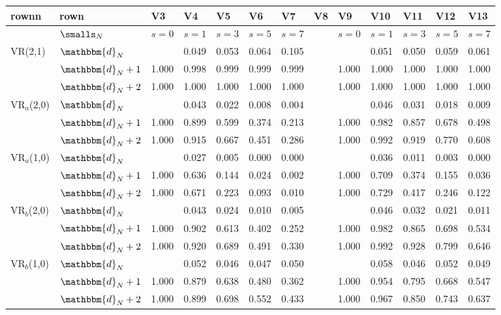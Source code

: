 \begin{table}[ht]
\centering
\begin{tabular}{lllllllllllll}
  \hline
rownn & rown & V3 & V4 & V5 & V6 & V7 & V8 & V9 & V10 & V11 & V12 & V13 \\ 
  \hline
 & ${\smalls}_N$ & $s =0$ & $s =1$ & $s =3$ & $s =5$ & $s =7$ &  & $s =0$ & $s =1$ & $s =3$ & $s =5$ & $s =7$ \\ 
  VR(2,1) & ${\mathbbm{d}_{N}}$ &  & {0.049} & {0.053} & {0.064} & {0.105} &  &  & {0.051} & {0.050} & {0.059} & {0.061} \\ 
   & ${\mathbbm{d}_{N}}+1$ & 1.000 & 0.998 & 0.999 & 0.999 & 0.999 &  & 1.000 & 1.000 & 1.000 & 1.000 & 1.000 \\ 
   & ${\mathbbm{d}_{N}}+2$ & 1.000 & 1.000 & 1.000 & 1.000 & 1.000 &  & 1.000 & 1.000 & 1.000 & 1.000 & 1.000 \\ 
  \midrule VR$_a$(2,0) & ${\mathbbm{d}_{N}}$ &  & {0.043} & {0.022} & {0.008} & {0.004} &  &  & {0.046} & {0.031} & {0.018} & {0.009} \\ 
   & ${\mathbbm{d}_{N}}+1$ & 1.000 & 0.899 & 0.599 & 0.374 & 0.213 &  & 1.000 & 0.982 & 0.857 & 0.678 & 0.498 \\ 
   & ${\mathbbm{d}_{N}}+2$ & 1.000 & 0.915 & 0.667 & 0.451 & 0.286 &  & 1.000 & 0.992 & 0.919 & 0.770 & 0.608 \\ 
  \midrule VR$_a$(1,0) & ${\mathbbm{d}_{N}}$ &  & {0.027} & {0.005} & {0.000} & {0.000} &  &  & {0.036} & {0.011} & {0.003} & {0.000} \\ 
   & ${\mathbbm{d}_{N}}+1$ & 1.000 & 0.636 & 0.144 & 0.024 & 0.002 &  & 1.000 & 0.709 & 0.374 & 0.155 & 0.036 \\ 
   & ${\mathbbm{d}_{N}}+2$ & 1.000 & 0.671 & 0.223 & 0.093 & 0.010 &  & 1.000 & 0.729 & 0.417 & 0.246 & 0.122 \\ 
  \midrule VR$_b$(2,0) & ${\mathbbm{d}_{N}}$ &  & {0.043} & {0.024} & {0.010} & {0.005} &  &  & {0.046} & {0.032} & {0.021} & {0.011} \\ 
   & ${\mathbbm{d}_{N}}+1$ & 1.000 & 0.902 & 0.613 & 0.402 & 0.252 &  & 1.000 & 0.982 & 0.865 & 0.698 & 0.534 \\ 
   & ${\mathbbm{d}_{N}}+2$ & 1.000 & 0.920 & 0.689 & 0.491 & 0.330 &  & 1.000 & 0.992 & 0.928 & 0.799 & 0.646 \\ 
  \midrule VR$_b$(1,0) & ${\mathbbm{d}_{N}}$ &  & {0.052} & {0.046} & {0.047} & {0.050} &  &  & {0.058} & {0.046} & {0.052} & {0.049} \\ 
   & ${\mathbbm{d}_{N}}+1$ & 1.000 & 0.879 & 0.638 & 0.480 & 0.362 &  & 1.000 & 0.954 & 0.795 & 0.668 & 0.547 \\ 
   & ${\mathbbm{d}_{N}}+2$ & 1.000 & 0.899 & 0.698 & 0.552 & 0.433 &  & 1.000 & 0.967 & 0.850 & 0.743 & 0.637 \\ 
   \hline
\end{tabular}
\end{table}
